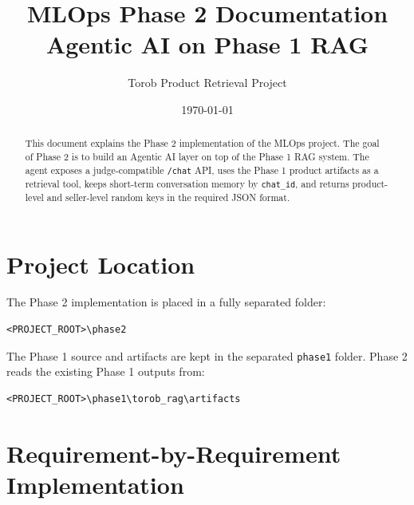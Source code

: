 \documentclass[12pt,a4paper]{article}
\title{MLOps Phase 2 Documentation\\Agentic AI on Phase 1 RAG}
\author{Torob Product Retrieval Project}
\date{\today}
\begin{document}
\maketitle

\begin{abstract}
This document explains the Phase 2 implementation of the MLOps project. The goal of Phase 2 is to build an Agentic AI layer on top of the Phase 1 RAG system. The agent exposes a judge-compatible \texttt{/chat} API, uses the Phase 1 product artifacts as a retrieval tool, keeps short-term conversation memory by \texttt{chat\_id}, and returns product-level and seller-level random keys in the required JSON format.
\end{abstract}

\tableofcontents
\newpage

\section{Project Location}

The Phase 2 implementation is placed in a fully separated folder:

\begin{lstlisting}
<PROJECT_ROOT>\phase2
\end{lstlisting}

The Phase 1 source and artifacts are kept in the separated \texttt{phase1} folder. Phase 2 reads the existing Phase 1 outputs from:

\begin{lstlisting}
<PROJECT_ROOT>\phase1\torob_rag\artifacts
\end{lstlisting}

\section{Requirement-by-Requirement Implementation}
\end{document}
